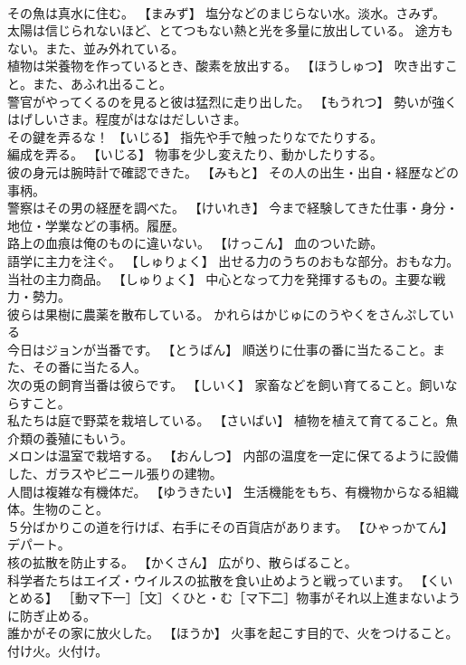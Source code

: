 \documentclass[8pt]{extreport}
\begin{document}
\begin{CJK}{UTF8}{min}
\\	その魚は真水に住む。	【まみず】 塩分などのまじらない水。淡水。さみず。
\\	太陽は信じられないほど、とてつもない熱と光を多量に放出している。	途方もない。また、並み外れている。
\\	植物は栄養物を作っているとき、酸素を放出する。	【ほうしゅつ】 吹き出すこと。また、あふれ出ること。
\\	警官がやってくるのを見ると彼は猛烈に走り出した。	【もうれつ】 勢いが強くはげしいさま。程度がはなはだしいさま。
\\	その鍵を弄るな！	【いじる】 指先や手で触ったりなでたりする。
\\	編成を弄る。	【いじる】 物事を少し変えたり、動かしたりする。
\\	彼の身元は腕時計で確認できた。	【みもと】 その人の出生・出自・経歴などの事柄。
\\	警察はその男の経歴を調べた。	【けいれき】 今まで経験してきた仕事・身分・地位・学業などの事柄。履歴。
\\	路上の血痕は俺のものに違いない。	【けっこん】 血のついた跡。
\\	語学に主力を注ぐ。	【しゅりょく】 出せる力のうちのおもな部分。おもな力。
\\	当社の主力商品。	【しゅりょく】 中心となって力を発揮するもの。主要な戦力・勢力。
\\	彼らは果樹に農薬を散布している。	かれらはかじゅにのうやくをさんぷしている 
\\	今日はジョンが当番です。	【とうばん】 順送りに仕事の番に当たること。また、その番に当たる人。
\\	次の兎の飼育当番は彼らです。	【しいく】 家畜などを飼い育てること。飼いならすこと。
\\	私たちは庭で野菜を栽培している。	【さいばい】 植物を植えて育てること。魚介類の養殖にもいう。
\\	メロンは温室で栽培する。	【おんしつ】 内部の温度を一定に保てるように設備した、ガラスやビニール張りの建物。
\\	人間は複雑な有機体だ。	【ゆうきたい】 生活機能をもち、有機物からなる組織体。生物のこと。
\\	５分ばかりこの道を行けば、右手にその百貨店があります。	【ひゃっかてん】 デパート。
\\	核の拡散を防止する。	【かくさん】 広がり、散らばること。
\\	科学者たちはエイズ・ウイルスの拡散を食い止めようと戦っています。	【くいとめる】 ［動マ下一］［文］くひと・む［マ下二］物事がそれ以上進まないように防ぎ止める。
\\	誰かがその家に放火した。	【ほうか】 火事を起こす目的で、火をつけること。付け火。火付け。

\end{CJK}
\end{document}
